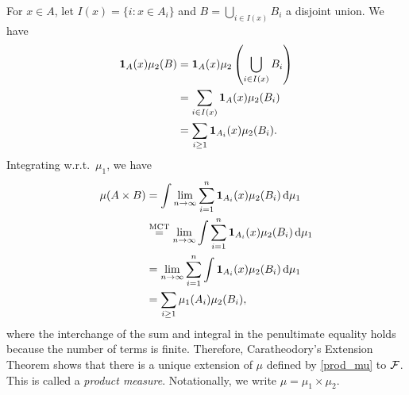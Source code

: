 \documentclass[12pt]{article}
\begin{document}
For $x \in A$, let $I(x)=\{i:x \in A_i\}$ and $B= \bigcup_{i \in I(x)} {B_i}$ a disjoint union. We have
\begin{align*}
{\bf 1}_{A}(x) \mu_2(B) 
&={\bf 1}_{A}(x) \mu_2\left(\bigcup_{i \in I(x)} {B_i}\right)\\
&= \sum_{i \in I(x)} {\bf 1}_{A}(x) \mu_2 (B_i)\\
& =\sum_{i\geq 1} {\bf 1}_{A_i}(x) \mu_2 (B_i).
\end{align*}
Integrating w.r.t.\ $\mu_1$, we have
\begin{align*}
\mu (A\times B) 
&=\int \lim_{n \to \infty}{\sum_{i=1}^n {{\bf 1}_{A_i} (x)\mu_2 (B_i) \,\mathrm{d} \mu_1}}\\
&\stackrel{\text{MCT}}{=}\lim_{n \to \infty} \int {\sum_{i=1}^n {{\bf 1}_{A_i} (x)\mu_2 (B_i) \,\mathrm{d}\mu_1}}\\
& =\lim_{n \to \infty}\sum_{i=1}^n{\int  {\bf 1}_{A_i} (x)\mu_2 (B_i) \,\mathrm{d} \mu_1}\\
& =\sum_{i\geq 1}\mu_1(A_i)\mu_2 (B_i),
\end{align*}
where the interchange of the sum and integral in the penultimate equality holds because the number of terms is finite. Therefore, Caratheodory’s Extension Theorem shows that there is a unique extension of $\mu$ defined by \cref{prod_mu} to $\mathcal{F}$. This is called a \emph{product measure}. Notationally, we write $\mu = \mu_1 \times \mu_2$.
\end{document}
